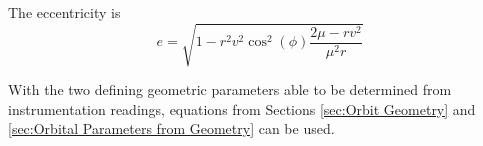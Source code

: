 \documentclass[../basicOrbitalDynamics.tex]{subfiles}
\begin{document}
\bigskip
The eccentricity is
$$e=\sqrt{1-r^2v^2\cos^2(\phi)\frac{2\mu-rv^2}{\mu^2r}}$$

With the two defining geometric parameters able to be determined from instrumentation readings, equations from Sections \ref{sec:Orbit Geometry} and \ref{sec:Orbital Parameters from Geometry} can be used.

\begin{comment}
\bigskip\bigskip
\subsection{Apsis Radii}
The radii of the apses (periapsis and apoapsis) can be found using a combination of conservation of energy and conservation of angular momentum. The angular momentum at any point is $h=rv_\theta$. Using this, an expression can be found for the radii of the apses (keeping in mind that at periapsis and apoapsis, the velocity is entirely along the horizontal with $\phi=0$).

Beginning with conservation of momentum,
\begin{align*}
    \st{h}{aps}             & = h        \\
    \st{r}{aps}\st{v}{aps} & =rv_\theta \\
\end{align*}
\begin{equation}\label{Apses Radius from h}
    \st{v}{aps}=\frac{rv_\theta}{\st{r}{aps}}
\end{equation}

Switching now to conservation of energy,
\begin{align*}
    \frac{1}{2}\st{v}{aps}^2-\frac{\mu}{\st{r}{aps}} & =\frac{1}{2}v^2-\frac{\mu}{r}                 \\
    \st{v}{aps}^2                                     & =v^2-\frac{2\mu}{r}+\frac{2\mu}{\st{r}{aps}} \\
\end{align*}
\begin{equation}\label{Apses Velocity from Radius}
    \st{v}{aps}=\sqrt{v^2-\frac{2\mu}{r}+\frac{2\mu}{\st{r}{aps}}}
\end{equation}

Setting \eqref{Apses Velocity from Radius} and \eqref{Apses Radius from h} equal to each other,
\begin{align*}
    \frac{rv_\theta}{\st{r}{aps}}       & = \sqrt{v^2-\frac{2\mu}{r}+\frac{2\mu}{\st{r}{aps}}}                            \\
    \frac{r^2v_\theta^2}{\st{r}{aps}^2} & = v^2-\frac{2\mu}{r}+\frac{2\mu}{\st{r}{aps}}                                   \\
    r^2v_\theta^2                        & = v^2\st{r}{aps}^2-\frac{2\mu}{r}\st{r}{aps}^2+2\mu{}\st{r}{aps}              \\
    0                                    & = \left(\frac{2\mu}{r}-v^2\right)\st{r}{aps}^2-2\mu{}\st{r}{aps}+r^2v_\theta^2 \\
\end{align*}


\end{comment}
\end{document}
